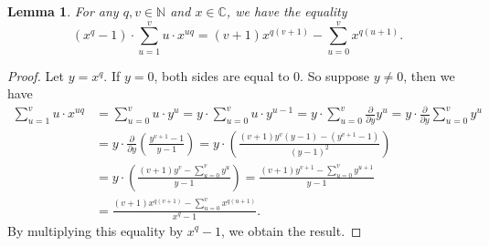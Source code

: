 \documentclass[12pt,a4paper]{article}
\newtheorem{lemma}[theorem]{Lemma}
\theoremstyle{definition}
\newcommand{\Nbb}{\mathbb{N}}
\newcommand{\C}{\mathbb{C}}
\newcommand{\R}{\mathbb{R}}
\newcommand{\Z}{\mathbb{Z}}
\newcommand{\z}{\zeta}
\newcommand{\ev}{\mathrm{ev}}
\newcommand{\uo}{\overline{r_2}}
\newcommand{\vo}{\overline{r_1}}
\begin{document}
\iffalse
Formally, we can regard $\beta,\Gamma_q$ and $\Delta$ as elements of $\Z[X_1,X_2,\dots,X_{r_3}]$. By abuse of notation, we can then denote $\beta(x),\Gamma_q(x)$ and $\Delta(x)$ their respective images under the homomorphism $\Z[X_1,X_2,\dots,X_{r_3}]\to \Z[x]$ determined by $X_u\mapsto x^{u-1}$ for all $1\leq u\leq r_3$. Since the we regard the indices of $X_u$ modulo $r_3$, this map is well defined only modulo $x^3-1$ (so we should in fact take the codomain to be $\Z[x]/(x^{r_3}-1)$), but we will only be interested in the values of these polynomials at $r_3$-th roots of unity, so this isn't an issue. With this in mind, we have
$$\beta(x)\approx R(x),$$
$$\Gamma_q(x)\approx x^q\cdot(1+x+\dots+x^{\uo-1})(1+x^{r_3-\uo}+x^{2(r_3-\uo)}+\dots+x^{(r_3-\vo/\uo-1)(r_3-\uo)})$$
and
$$\Delta(x)\approx(1+x+\dots+x^{\uo-1})(1+x+\dots+x^{\vo-1})(x^{r_3-\uo}+2x^{2(r_3-\uo)}+\dots+(r_3-1)x^{(r_3-1)(r_3-\uo)}),$$
where $\approx$ denotes the congruence modulo $x^{r_3}-1$.  In cases where there could be confusion, we will denote the evaluation homomorphism $\Z[x]\to \Z[\zeta]$ given by $x\mapsto\zeta$ by $\ev_{\z}$.
\fi

\begin{lemma}
For any $q,v\in\Nbb$ and $x\in\C$, we have the equality
$$(x^q-1)\cdot\sum_{u=1}^{v}u\cdot x^{uq}=(v+1)x^{q(v+1)}-\sum_{u=0}^v x^{q(u+1)}.$$
\end{lemma}
\begin{proof}
Let $y=x^q$. If $y=0$, both sides are equal to $0$. So suppose $y\neq 0$, then we have 
\begin{align*}
\sum_{u=1}^{v}u\cdot x^{uq}&=\sum_{u=0}^{v}u\cdot y^{u}=y\cdot \sum_{u=0}^{v}u\cdot y^{u-1}=y\cdot \sum_{u=0}^{v}\frac{\partial}{\partial y} y^u=y\cdot \frac{\partial}{\partial y}\sum_{u=0}^{v} y^u\\
&=y\cdot \frac{\partial}{\partial y} \left(\frac{y^{v+1}-1}{y-1}\right)=y\cdot \left(\frac{(v+1)y^{v}(y-1)-(y^{v+1}-1)}{(y-1)^2}\right)\\
&=y\cdot \left(\frac{(v+1)y^{v}-\sum_{u=0}^v y^u}{y-1}\right)=\frac{(v+1)y^{v+1}-\sum_{u=0}^v y^{u+1}}{y-1}\\
&=\frac{(v+1)x^{q(v+1)}-\sum_{u=0}^v x^{q(u+1)}}{x^q-1}.
\end{align*}
By multiplying this equality by $x^q-1$, we obtain the result.
\end{proof}
\end{document}
